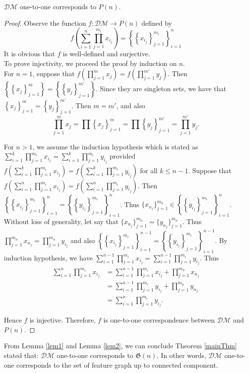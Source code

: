 \begin{lem} \label{lem2}
	$\mathcal{DM}$ one-to-one corresponds to $P(n)$.
\end{lem}
\begin{proof}
	Observe the function $f:\mathcal{DM}\to P(n)$ defined by
	$$
	f\left( \sum_{i=1}^{n} \prod_{j=1}^{m_i} x_{i_j} \right) = \left\{\left\{x_{i_j}\right\}_{j=1}^{m_i}\right\}_{i=1}^n 
	$$
	It is obvious that $f$ is well-defined and surjective.\\
	
	To prove injectivity, we proceed the proof by induction on $n$.\\
	For $n=1$, suppose that $f\left( \prod_{j=1}^{m} x_j \right) =f\left( \prod_{j=1}^{m'} y_j \right)  $. Then $\left\{\left\{x_{j}\right\}_{j=1}^{m}\right\} = \left\{\left\{y_{j}\right\}_{j=1}^{m'}\right\}$.
	Since they are singleton sets, we have that $\left\{x_{j}\right\}_{j=1}^{m} = \left\{y_{j}\right\}_{j=1}^{m'}$.
	Then $m = m'$, and also 
	$$\prod_{j=1}^{m} x_j = \prod\left\{x_{j}\right\}_{j=1}^{m} = \prod\left\{y_{j}\right\}_{j=1}^{m'} = \prod_{j=1}^{m'} y_j.$$
	
	For $n>1$, we assume the induction hypothesis which is stated as $\sum_{i=1}^{k} \prod_{j=1}^{m_i} x_{i_j} = \sum_{i=1}^{k} \prod_{j=1}^{m_i} y_{i_j}$ provided $f(\sum_{i=1}^{k} \prod_{j=1}^{m_i} x_{i_j}) = f(\sum_{i=1}^{k} \prod_{j=1}^{m_i} y_{i_j})$ for all $k\leq n-1$.
	Suppose that $f(\sum_{i=1}^{n} \prod_{j=1}^{m_i} x_{i_j}) = f(\sum_{i=1}^{n} \prod_{j=1}^{m_i} y_{i_j})$.
	Then $\left\{\left\{x_{i_j}\right\}_{j=1}^{m_i}\right\}_{i=1}^n = \left\{\left\{y_{i_j}\right\}_{j=1}^{m_i}\right\}_{i=1}^n$.
	Thus $\{x_{n_j}\}_{j=1}^{m_n} \in \left\{\left\{y_{i_j}\right\}_{j=1}^{m_i}\right\}_{i=1}^n$. Without loss of generality, let say that $\{x_{n_j}\}_{j=1}^{m_n} = \{y_{n_j}\}_{j=1}^{m_n}$.
	Thus $\prod_{j=1}^{m_n} x_{n_j} = \prod_{j=1}^{m_n} y_{i_j}$ and also
	$\left\{\left\{x_{i_j}\right\}_{j=1}^{m_i}\right\}_{i=1}^{n-1} = \left\{\left\{y_{i_j}\right\}_{j=1}^{m_i}\right\}_{i=1}^{n-1}$. By induction hypothesis, we have $\sum_{i=1}^{n-1} \prod_{j=1}^{m_i} x_{i_j} = \sum_{i=1}^{n-1} \prod_{j=1}^{m_i} y_{i_j}$. Thus
	\begin{align*}
		\sum_{i=1}^{n} \prod_{j=1}^{m_i} x_{i_j} &= \sum_{i=1}^{n-1} \prod_{j=1}^{m_i} x_{i_j} + \prod_{j=1}^{m_n} x_{n_j}\\
		&= \sum_{i=1}^{n-1} \prod_{j=1}^{m_i} y_{i_j} + \prod_{j=1}^{m_n} y_{n_j}\\
		&= \sum_{i=1}^{n} \prod_{j=1}^{m_i} y_{i_j}.
	\end{align*}
	
	Hence $f$ is injective. Therefore, $f$ is one-to-one correspondence between $\mathcal{DM}$ and $P(n)$.
\end{proof}

From Lemma \ref{lem1} and Lemma \ref{lem2}, we can conclude Theorem \ref{mainThm} stated that:
$\mathcal{DM}$ one-to-one corresponds to $\mathfrak{G}(n)$. In other words, $\mathcal{DM}$ one-to-one corresponds to the set of feature graph up to connected component.





